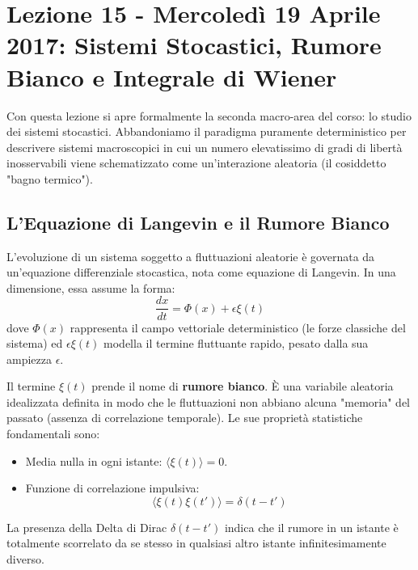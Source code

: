 \documentclass[12pt,a4paper]{article}
\begin{document}
\newpage

\section{Lezione 15 - Mercoledì 19 Aprile 2017: Sistemi Stocastici, Rumore Bianco e Integrale di Wiener}

Con questa lezione si apre formalmente la seconda macro-area del corso: lo studio dei sistemi stocastici. Abbandoniamo il paradigma puramente deterministico per descrivere sistemi macroscopici in cui un numero elevatissimo di gradi di libertà inosservabili viene schematizzato come un'interazione aleatoria (il cosiddetto "bagno termico").

\subsection{L'Equazione di Langevin e il Rumore Bianco}
L'evoluzione di un sistema soggetto a fluttuazioni aleatorie è governata da un'equazione differenziale stocastica, nota come equazione di Langevin. In una dimensione, essa assume la forma:
\begin{equation}
\frac{dx}{dt} = \Phi(x) + \epsilon \xi(t)
\end{equation}
dove $\Phi(x)$ rappresenta il campo vettoriale deterministico (le forze classiche del sistema) ed $\epsilon \xi(t)$ modella il termine fluttuante rapido, pesato dalla sua ampiezza $\epsilon$. 

Il termine $\xi(t)$ prende il nome di \textbf{rumore bianco}. È una variabile aleatoria idealizzata definita in modo che le fluttuazioni non abbiano alcuna "memoria" del passato (assenza di correlazione temporale). Le sue proprietà statistiche fondamentali sono:
\begin{itemize}
    \item Media nulla in ogni istante: $\langle \xi(t) \rangle = 0$.
    \item Funzione di correlazione impulsiva: 
    \begin{equation}
    \langle \xi(t) \xi(t') \rangle = \delta(t - t')
    \end{equation}
\end{itemize}
La presenza della Delta di Dirac $\delta(t-t')$ indica che il rumore in un istante è totalmente scorrelato da se stesso in qualsiasi altro istante infinitesimamente diverso.
\end{document}
